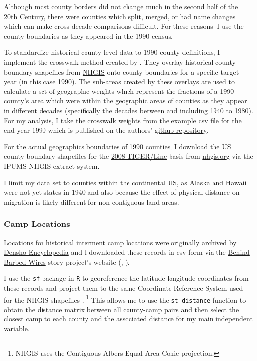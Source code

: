 \documentclass[12pt]{article}
\begin{document}
Although most county borders did not change much in the second half of
the 20th Century, there were counties which split, merged, or had name
changes which can make cross-decade comparisons difficult. For these
reasons, I use the county boundaries as they appeared in the 1990 census.


To standardize historical county-level data to 1990 county definitions, I implement the crosswalk
method created by \cite{eckert_method_2020}. They overlay historical
county boundary shapefiles from \href{https://www.nhgis.org/}{NHGIS}
onto county boundaries for a specific target year (in this case 1990).
The sub-areas created by these overlays are used to calculate a set of
geographic weights which represent the fractions of a 1990 county's area
which were within the geographic areas of counties as they appear in
different decades (specifically the decades between and including 1940
to 1980). For my analysis, I take the crosswalk weights from the example
csv file for the end year 1990 which is published on the authors'
\href{https://github.com/liang-jack-a/EGLP_Crosswalk/tree/master}{github
repository}.

For the actual geographics boundaries of 1990 counties, I download the US county boundary shapefiles for the \href{https://www.census.gov/geographies/mapping-files/time-series/geo/tiger-line-file.html}{2008 TIGER/Line} basis from \url{nhgis.org} via the IPUMS NHGIS extract system.

I limit my data set to counties within the continental US, as Alaska and Hawaii were not yet states in 1940 and also because the effect of physical distance on migration is likely different for non-contiguous land areas.


\subsubsection{Camp Locations}\label{camp-locations}

Locations for historical interment camp locations were originally archived by
\href{http://encyclopedia.densho.org/War_Relocation_Authority/\#Planning_the_Camps}{Densho
Encyclopedia} and I downloaded these records in csv form via the
\href{https://www.arcgis.com/home/item.html?id=69183af8d45d4f46a9dc4eba99440891}{Behind
Barbed Wires} story project's website
(\cite{chrkan_behind_2019}, \cite{robinson_war_2023}).

I use the \texttt{sf} package in \texttt{R} to georeference the latitude-longitude coordinates from these records and project them to the same Coordinate Reference System used for the NHGIS shapefiles \citep{pebesma_simple_2018}.
\footnote{NHGIS uses the Contiguous Albers Equal Area Conic projection.}
This allows me to use the \texttt{st\_distance} function to obtain the distance matrix between all county-camp pairs and then select the closest camp to each county and the associated distance for my main independent variable.
\end{document}
